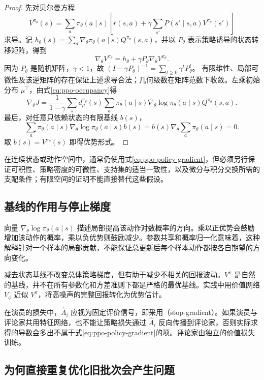 \documentclass[UTF8]{ctexart}
\begin{document}
\begin{proof}
先对贝尔曼方程
\[
  V^{\pi_\theta}(s)
  =\sum_a\pi_\theta(a\mid s)
    \left[\bar r(s,a)+\gamma\sum_{s'}P(s'\mid s,a)
          V^{\pi_\theta}(s')\right]
\]
求导。记
$h_\theta(s)=\sum_a\nabla_\theta\pi_\theta(a\mid s)
Q^{\pi_\theta}(s,a)$，并以 $P_\theta$ 表示策略诱导的状态转移矩阵，得到
\[
  \nabla_\theta V^{\pi_\theta}
  =h_\theta+\gamma P_\theta\nabla_\theta V^{\pi_\theta}.
\]
因为 $P_\theta$ 是随机矩阵，$\gamma<1$，故
$(I-\gamma P_\theta)^{-1}=\sum_{t\ge0}\gamma^tP_\theta^t$。
有限维性、局部可微性及该逆矩阵的存在保证上述求导合法；几何级数在矩阵范数下收敛。左乘初始分布 $\mu^\top$，由式\eqref{eq:ppo-occupancy}得
\[
  \nabla_\theta J
  =\frac{1}{1-\gamma}\sum_s d^{\pi_\theta}_\mu(s)
     \sum_a\pi_\theta(a\mid s)
     \nabla_\theta\log\pi_\theta(a\mid s)
     Q^{\pi_\theta}(s,a).
\]
最后，对任意只依赖状态的有限基线 $b(s)$，
\[
  \sum_a\pi_\theta(a\mid s)
  \nabla_\theta\log\pi_\theta(a\mid s)b(s)
  =b(s)\nabla_\theta\sum_a\pi_\theta(a\mid s)=0.
\]
取 $b(s)=V^{\pi_\theta}(s)$ 即得优势形式。
\end{proof}

在连续状态或动作空间中，通常仍使用式\eqref{eq:ppo-policy-gradient}，但必须另行保证可积性、策略密度的可微性、支持集的适当一致性，以及微分与积分交换所需的支配条件；有限空间的证明不能直接替代这些假设。

\subsection{基线的作用与停止梯度}

向量 $\nabla_\theta\log\pi_\theta(a\mid s)$ 描述局部提高该动作对数概率的方向。乘以正优势会鼓励增加该动作的概率，乘以负优势则鼓励减少。参数共享和概率归一化意味着，这种解释针对一个样本的局部贡献，不能保证总更新后每个样本动作都按各自期望的方向变化。

减去状态基线不改变总体策略梯度，但有助于减少不相关的回报波动。$V^\pi$ 是自然的基线，并不在所有参数化和方差准则下都是严格的最优基线。实践中用价值网络 $V_\phi$ 近似 $V^\pi$，将高噪声的完整回报转化为优势估计。

在演员的损失中，$\widehat A_i$ 应视为固定评价信号，即采用（stop-gradient）。如果演员与评论家共用特征网络，也不能让策略损失通过 $\widehat A_i$ 反向传播到评论家，否则实际求得的导数会多出不属于式\eqref{eq:ppo-policy-gradient}的项。评论家由独立的价值损失训练。

\subsection{为何直接重复优化旧批次会产生问题}
\end{document}
